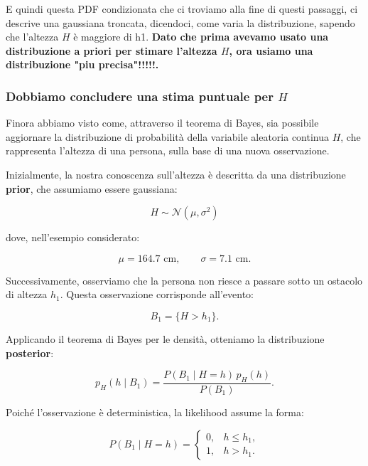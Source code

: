 E quindi questa PDF condizionata che ci troviamo alla fine di questi passaggi, ci descrive una gaussiana troncata, dicendoci, come varia la distribuzione, sapendo che l'altezza $H$ è maggiore di h1.
\textbf{Dato che prima avevamo usato una distribuzione a priori per stimare l'altezza $H$, ora usiamo una distribuzione "piu precisa"!!!!!.}

\subsubsection{Dobbiamo concludere una stima puntuale per $H$}

Finora abbiamo visto come, attraverso il teorema di Bayes, sia possibile aggiornare la distribuzione di probabilità della variabile aleatoria continua $H$, che rappresenta l'altezza di una persona, sulla base di una nuova osservazione.

Inizialmente, la nostra conoscenza sull'altezza è descritta da una distribuzione \textbf{prior}, che assumiamo essere gaussiana:

\begin{equation*}
    H \sim \mathcal{N}(\mu,\sigma^2)
\end{equation*}

dove, nell'esempio considerato:

\begin{equation*}
    \mu = 164.7 \text{ cm},
    \qquad
    \sigma = 7.1 \text{ cm}.
\end{equation*}

Successivamente, osserviamo che la persona non riesce a passare sotto un ostacolo di altezza $h_1$. Questa osservazione corrisponde all'evento:

\begin{equation*}
    B_1 = \{H > h_1\}.
\end{equation*}

Applicando il teorema di Bayes per le densità, otteniamo la distribuzione \textbf{posterior}:

\begin{equation*}
    p_H(h \mid B_1)
    =
    \frac{P(B_1 \mid H=h)\,p_H(h)}{P(B_1)}.
\end{equation*}

Poiché l'osservazione è deterministica, la likelihood assume la forma:

\begin{equation*}
    P(B_1 \mid H=h)
    =
    \begin{cases}
        0, & h \leq h_1,\\
        1, & h > h_1.
    \end{cases}
\end{equation*}

